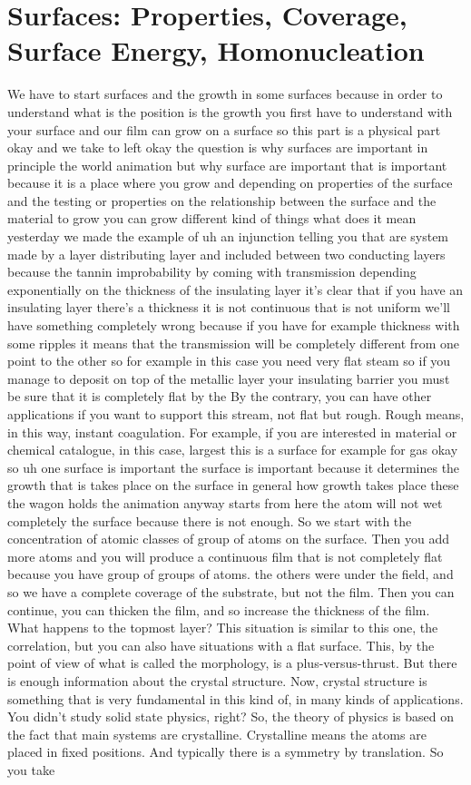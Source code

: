 \chapter{Surfaces: Properties, Coverage, Surface Energy, Homonucleation}
We have to start surfaces and the growth in some surfaces because in order to understand what is the position is the growth you first have to understand with your surface and our film can grow on a surface so this part is a physical part okay and we take to left okay the question is why surfaces are important in principle the world animation but why surface are important that is important because it is a place where you grow and depending on properties of the surface and the testing or properties on the relationship between the surface and the material to grow you can grow different kind of things what does it mean yesterday we made the example of uh an injunction telling you that are system made by a layer distributing layer and included between two conducting layers because the tannin improbability by coming with transmission depending exponentially on the thickness of the insulating layer it's clear that if you have an insulating layer there's a thickness it is not continuous that is not uniform we'll have something completely wrong because if you have for example thickness with some ripples it means that the transmission will be completely different from one point to the other so for example in this case you need very flat steam so if you manage to deposit on top of the metallic layer your insulating barrier you must be sure that it is completely flat by the By the contrary, you can have other applications if you want to support this stream, not flat but rough. Rough means, in this way, instant coagulation. For example, if you are interested in material or chemical catalogue, in this case, largest this is a surface for example for gas okay so uh one surface is important the surface is important because it determines the growth that is takes place on the surface in general how growth takes place these the wagon holds the animation anyway starts from here the atom will not wet completely the surface because there is not enough. So we start with the concentration of atomic classes of group of atoms on the surface. Then you add more atoms and you will produce a continuous film that is not completely flat because you have group of groups of atoms. the others were under the field, and so we have a complete coverage of the substrate, but not the film. Then you can continue, you can thicken the film, and so increase the thickness of the film. What happens to the topmost layer? This situation is similar to this one, the correlation, but you can also have situations with a flat surface. This, by the point of view of what is called the morphology, is a plus-versus-thrust. But there is enough information about the crystal structure. Now, crystal structure is something that is very fundamental in this kind of, in many kinds of applications. You didn't study solid state physics, right? So, the theory of physics is based on the fact that main systems are crystalline. Crystalline means the atoms are placed in fixed positions. And typically there is a symmetry by translation. So you take 